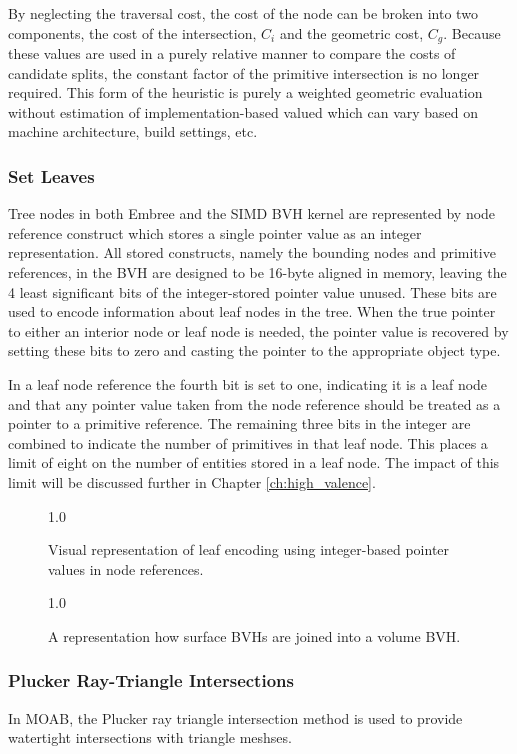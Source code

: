 By neglecting the traversal cost, the cost of the node can be broken into two
components, the cost of the intersection, $C_{i}$ and the geometric cost,
$C_{g}$. Because these values are used in a purely relative manner to compare
the costs of candidate splits, the constant factor of the primitive intersection
is no longer required. This form of the heuristic is purely a weighted geometric
evaluation without estimation of implementation-based valued which can vary
based on machine architecture, build settings, etc.

\subsubsection{Set Leaves}

Tree nodes in both Embree and the SIMD BVH kernel are represented by node
reference construct which stores a single pointer value as an integer
representation. All stored constructs, namely the bounding nodes and primitive
references, in the BVH are designed to be 16-byte aligned in memory, leaving the
4 least significant bits of the integer-stored pointer value unused. These bits
are used to encode information about leaf nodes in the tree. When the true
pointer to either an interior node or leaf node is needed, the pointer value is
recovered by setting these bits to zero and casting the pointer to the
appropriate object type.

In a leaf node reference the fourth bit is set to one, indicating it is a leaf
node and that any pointer value taken from the node reference should be treated
as a pointer to a primitive reference. The remaining three bits in the integer are
combined to indicate the number of primitives in that leaf node. This places a
limit of eight on the number of entities stored in a leaf node. The impact of
this limit will be discussed further in Chapter \ref{ch:high_valence}.

\begin{figure}[H]
  \centering
  {1.0\textwidth}
  \caption{Visual representation of leaf encoding using integer-based
    pointer values in node references.}
  \label{fig:leaf_encoding}
\end{figure}

\begin{figure}[H]
  \centering
  {1.0\textwidth}
  \caption{A representation how surface BVHs are joined into a volume BVH.}
  \label{fig:quad_tree_sets}
\end{figure}



\subsubsection{Plucker Ray-Triangle Intersections}\label{sec:intersection_distances}

In MOAB, the Plucker ray triangle intersection\cite{Platis_2003} method is used to provide
watertight intersections with triangle meshses.



